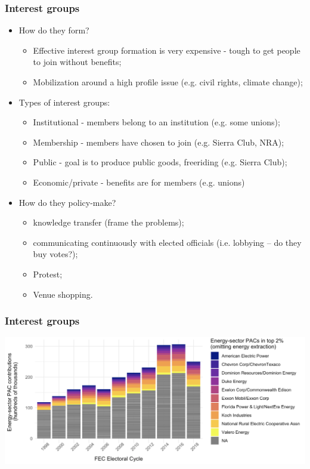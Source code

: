 \documentclass[aspectratio=169]{beamer}
\theoremstyle{principle}
\begin{document}
\begin{frame}
\frametitle{Interest groups}
\begin{itemize}
\item How do they form?
\begin{itemize}
\item Effective interest group formation is very expensive - tough to get people to join without benefits;
\item Mobilization around a high profile issue (e.g. civil rights, climate change);
\end{itemize}
\bigskip
\item Types of interest groups:
\begin{itemize}
\item Institutional - members belong to an institution (e.g. some unions);
\item Membership - members have chosen to join (e.g. Sierra Club, NRA);
\item Public - goal is to produce public goods, freeriding (e.g. Sierra Club);
\item Economic/private - benefits are for members (e.g. unions)
\end{itemize}
\bigskip
\item How do they policy-make?
\begin{itemize}
\item knowledge transfer (frame the problems);
\item communicating continuously with elected officials (i.e. lobbying -- do they buy votes?);
\item Protest;
\item Venue shopping.
\end{itemize}
\end{itemize}
\end{frame}

\begin{frame}
\frametitle{Interest groups}
    \begin{center}
     \includegraphics[scale=0.45]{Energy_PAC_Contributions.png}
     \end{center}
\end{frame}
\end{document}
